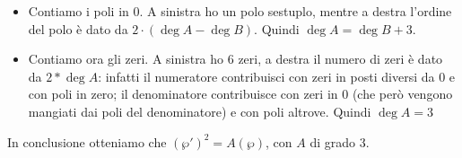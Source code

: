 \begin{itemize}
 \item Contiamo i poli in 0. A sinistra ho un polo sestuplo, mentre a destra l'ordine del polo è dato da $2\cdot (\deg A - \deg B)$. Quindi $\deg A = \deg B + 3$.
 \item Contiamo ora gli zeri. A sinistra ho 6 zeri, a destra il numero di zeri è dato da $2*\deg A$: infatti il numeratore contribuisci con zeri in posti diversi da 0 e con poli in zero; il denominatore contribuisce con zeri in 0 (che però vengono mangiati dai poli del denominatore) e con poli altrove. Quindi $\deg A = 3$
\end{itemize}

In conclusione otteniamo che $(\wp')^2=A(\wp)$, con $A$ di grado 3.














